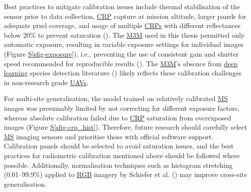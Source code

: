\documentclass[
]{scrreprt}
\newcommand*\quartosfigref[1]{Figure \hyperref[#1]{S\ref{#1}}}
\begin{document}
Best practices to mitigate calibration issues include thermal
stabilisation of the sensor prior to data collection,
\hyperref[acronyms_CRP]{CRP} capture at mission altitude, larger panels
for adequate pixel coverage, and usage of multiple
\hyperref[acronyms_CRP]{CRPs} with different reflectances below 20\% to
prevent saturation
().
The \hyperref[acronyms_M3M]{M3M} used in this thesis permitted only
automatic exposure, resulting in variable exposure settings for
individual images (\quartosfigref{sfig-exposure}), i.e., preventing the
use of consistent gain and shutter speed recommended for reproducible
results (). The \hyperref[acronyms_M3M]{M3M}'s absence from
\hyperref[acronyms_DL]{deep learning} species detection literature
() likely reflects these calibration challenges in non-research
grade \hyperref[acronyms_UAV]{UAVs}.

For multi-site generalisation, the model trained on relatively
calibrated \hyperref[acronyms_MS]{MS} images was presumably limited by
not correcting for different exposure factors, whereas absolute
calibration failed due to \hyperref[acronyms_CRP]{CRP} saturation from
overexposed images (\quartosfigref{sfig-crp_hist}). Therefore, future
research should carefully select \hyperref[acronyms_MS]{MS} imaging
sensors and prioritise those with official software support. Calibration
panels should be selected to avoid saturation issues, and the best
practices for radiometric calibration mentioned above should be followed
where possible. Additionally, normalisation techniques such as histogram
stretching (0.01--99.9\%) applied to \hyperref[acronyms_RGB]{RGB}
imagery by Schiefer et al.
() may improve cross-site
generalisation.
\end{document}
